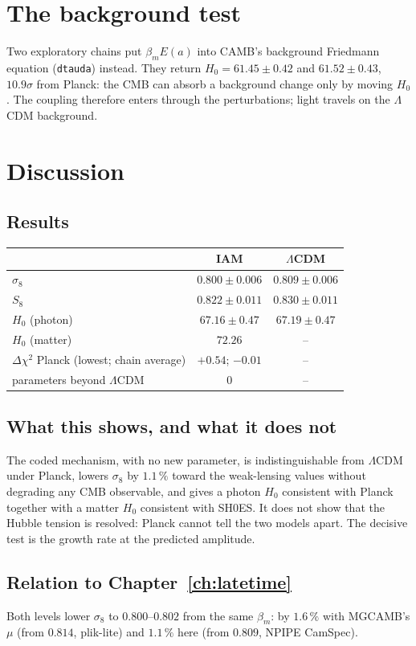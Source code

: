 \section{The background test}
Two exploratory chains put $\beta_mE(a)$ into CAMB's background Friedmann equation (\verb|dtauda|) instead. They return $H_0=61.45\pm0.42$ and
$61.52\pm0.43$, $10.9\sigma$ from Planck: the CMB can absorb a background change only by moving $H_0$. The coupling therefore enters through the
perturbations; light travels on the $\Lambda$CDM background.

\section{Discussion}
\subsection{Results}
\begin{center}\small
\begin{tabular}{lcc}\hline
& IAM & $\Lambda$CDM\\\hline
$\sigma_8$ & $0.800\pm0.006$ & $0.809\pm0.006$\\
$S_8$ & $0.822\pm0.011$ & $0.830\pm0.011$\\
$H_0$ (photon) & $67.16\pm0.47$ & $67.19\pm0.47$\\
$H_0$ (matter) & $72.26$ & --\\
$\Delta\chi^2$ Planck (lowest; chain average) & $+0.54$; $-0.01$ & --\\
parameters beyond $\Lambda$CDM & 0 & --\\\hline
\end{tabular}
\end{center}
\subsection{What this shows, and what it does not}
The coded mechanism, with no new parameter, is indistinguishable from $\Lambda$CDM under Planck, lowers $\sigma_8$ by $1.1\,\%$ toward the weak-lensing
values without degrading any CMB observable, and gives a photon $H_0$ consistent with Planck together with a matter $H_0$ consistent with SH0ES. It does not
show that the Hubble tension is resolved: Planck cannot tell the two models apart. The decisive test is the growth rate at the predicted amplitude.
\subsection{Relation to Chapter~\ref{ch:latetime}}
Both levels lower $\sigma_8$ to $0.800$--$0.802$ from the same $\beta_m$: by $1.6\,\%$ with MGCAMB's $\mu$ (from $0.814$, plik-lite) and $1.1\,\%$ here (from
$0.809$, NPIPE CamSpec).
